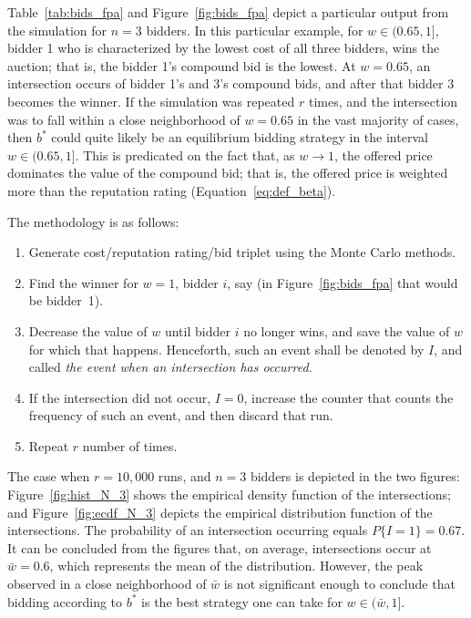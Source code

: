 Table~\ref{tab:bids_fpa} and Figure~\ref{fig:bids_fpa} depict a particular output from the simulation for $n=3$ bidders. In this particular example, for $w\in (0.65, 1]$, bidder 1 who is characterized by the lowest cost of all three bidders, wins the auction; that is, the bidder 1's compound bid is the lowest. At $w=0.65$, an intersection occurs of bidder 1's and 3's compound bids, and after that bidder 3 becomes the winner. If the simulation was repeated $r$ times, and the intersection was to fall within a close neighborhood of $w=0.65$ in the vast majority of cases, then $b^*$ could quite likely be an equilibrium bidding strategy in the interval $w\in (0.65, 1]$. This is predicated on the fact that, as $w\rightarrow 1$, the offered price dominates the value of the compound bid; that is, the offered price is weighted more than the reputation rating (Equation~\eqref{eq:def_beta}).

The methodology is as follows:
\begin{enumerate}
	\item Generate cost/reputation rating/bid triplet using the Monte Carlo methods.
	\item Find the winner for $w=1$, bidder $i$, say (in Figure~\ref{fig:bids_fpa} that would be bidder~1).
	\item Decrease the value of $w$ until bidder $i$ no longer wins, and save the value of $w$ for which that happens. Henceforth, such an event shall be denoted by $I$, and called \emph{the event when an intersection has occurred.}
	\item If the intersection did not occur, $I=0$, increase the counter that counts the frequency of such an event, and then discard that run.
	\item Repeat $r$ number of times.
\end{enumerate}

The case when $r=10,000$ runs, and $n=3$ bidders is depicted in the two figures: Figure~\ref{fig:hist_N_3} shows the empirical density function of the intersections; and Figure~\ref{fig:ecdf_N_3} depicts the empirical distribution function of the intersections. The probability of an intersection occurring equals $P\{I=1\} = 0.67$. It can be concluded from the figures that, on average, intersections occur at $\bar{w}=0.6$, which represents the mean of the distribution. However, the peak observed in a close neighborhood of $\bar{w}$ is not significant enough to conclude that bidding according to $b^*$ is the best strategy one can take for $w\in (\bar{w},1]$.

